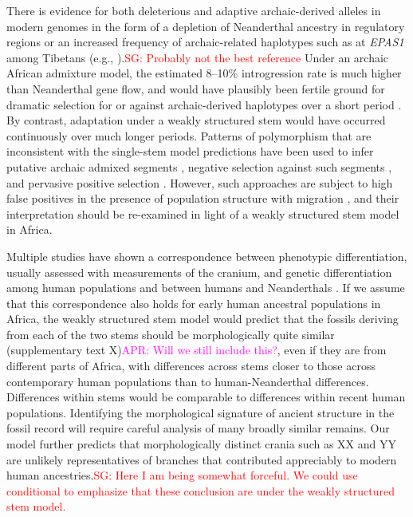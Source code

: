 \documentclass{article}
\newcommand{\sgcomment}[1]{{\textcolor{red}{SG: #1}}}
\newcommand{\aprcomment}[1]{{\textcolor{magenta}{APR: #1}}}
\begin{document}
There is evidence for both deleterious and adaptive archaic-derived alleles in
modern genomes in the form of a depletion of Neanderthal ancestry in regulatory
regions \citep{Petr2019-xo} or an increased frequency of archaic-related
haplotypes such as at \emph{EPAS1} among Tibetans (e.g.,
\citet{Zhang2021-xx}).\sgcomment{Probably not the best reference} Under an
archaic African admixture model, the estimated 8--10\% introgression rate is
much higher than Neanderthal gene flow, and would have plausibly been fertile
ground for dramatic selection for or against archaic-derived haplotypes over a
short period \citep{Wall2019-ao}. By contrast, adaptation under a weakly
structured stem would have occurred continuously over much longer periods.
Patterns of polymorphism that are inconsistent with the single-stem model
predictions have been used to infer putative archaic admixed segments
\citep{Plagnol2006-lt,Hsieh2016-gk,Wall2019-ao,Durvasula2020-td}, negative
selection against such segments \citep{Wall2019-ao}, and pervasive positive
selection \citep{Schrider2017-kl}. However, such approaches are subject to high
false positives in the presence of population structure with migration
\citep{Petr2019-xo}, and their interpretation should be re-examined in light of
a weakly structured stem model in Africa.

Multiple studies have shown a correspondence between phenotypic
differentiation, usually assessed with measurements of the cranium, and genetic
differentiation among human populations and between humans and Neanderthals
\citep{Relethford1994-mh,Weaver2008-ho,Von_Cramon-Taubadel2009-zb}. If we
assume that this correspondence also holds for early human ancestral
populations in Africa, the weakly structured stem model would predict that the
fossils deriving from each of the two stems should be morphologically quite
similar (supplementary text X)\aprcomment{Will we still include this?}, even if
they are from different parts of Africa, with differences across stems closer
to those across contemporary human populations than to human-Neanderthal
differences. Differences within stems would be comparable to differences within
recent human populations. Identifying the morphological signature of ancient
structure in the fossil record will require careful analysis of many broadly
similar remains. Our model further predicts that morphologically distinct
crania such as XX and YY are unlikely representatives of branches that
contributed appreciably to modern human ancestries.\sgcomment{Here I am being
somewhat forceful. We could use conditional to emphasize that these conclusion
are under the weakly structured stem model.}
\end{document}
